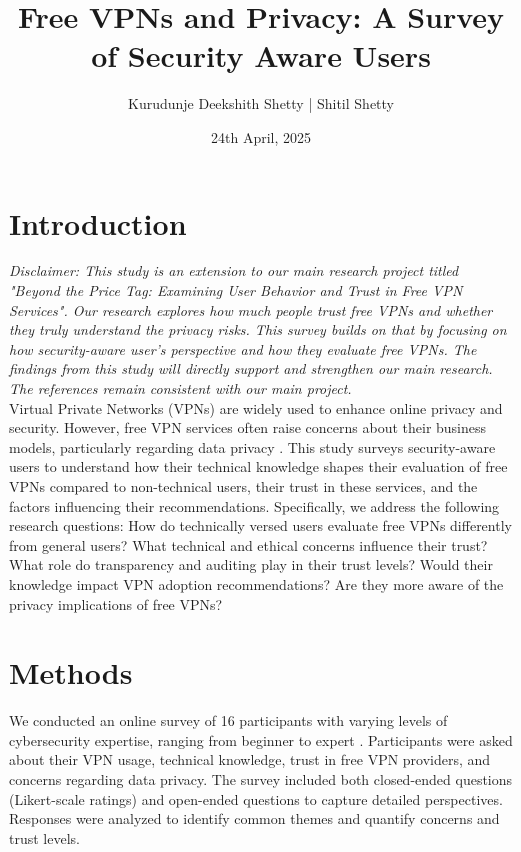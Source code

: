 \documentclass[11pt,a4paper]{article}
\begin{document}
\title{\textcolor{primary}{\textbf{Free VPNs and Privacy: A Survey of Security Aware Users}}}
\author{Kurudunje Deekshith Shetty | Shitil Shetty}
\date{24th April, 2025}

\maketitle

\section{Introduction}

\textit{Disclaimer: This study is an extension to our main research project titled "Beyond the Price Tag: Examining User Behavior and Trust in Free VPN Services". Our research explores how much people trust free VPNs and whether they truly understand the privacy risks. This survey builds on
that by focusing on how security-aware user's perspective and how they evaluate free VPNs. The findings from this study will directly support and strengthen our main research. The references remain consistent with our main project.} \\

Virtual Private Networks (VPNs) are widely used to enhance online privacy and security. However, free VPN services often raise concerns about their business models, particularly regarding data privacy \cite{abbas2023,khan2018,ramesh2022}. This study surveys security-aware users to understand how their technical knowledge shapes their evaluation of free VPNs compared to non-technical users, their trust in these services, and the factors influencing their recommendations. Specifically, we address the following research questions: How do technically versed users evaluate free VPNs differently from general users? What technical and ethical concerns influence their trust? What role do transparency and auditing play in their trust levels? Would their knowledge impact VPN adoption recommendations? Are they more aware of the privacy implications of free VPNs? \cite{namara2020}

\section{Methods}

We conducted an online survey of 16 participants with varying levels of cybersecurity expertise, ranging from beginner to expert \cite{dutkowska2022}. Participants were asked about their VPN usage, technical knowledge, trust in free VPN providers, and concerns regarding data privacy. The survey included both closed-ended questions (Likert-scale ratings) and open-ended questions to capture detailed perspectives. Responses were analyzed to identify common themes and quantify concerns and trust levels.
\end{document}
